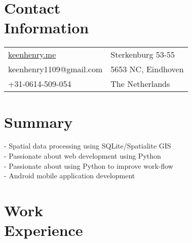 \documentclass[margin,line]{resume}
\begin{document}
\begin{resume}

    \section{\myheadingstyle Contact \\ Information}
      \begin{tabular}{@{}p{7cm}p{6cm}}
      \url{keenhenry.me}      & Sterkenburg 53-55 \\
      keenhenry1109@gmail.com & 5653 NC, Eindhoven \\
      +31-0614-509-054        & The Netherlands \\
      \end{tabular}
 
    \section{\myheadingstyle Summary}
      - Spatial data processing using SQLite/Spatialite GIS \\
      - Passionate about web development using Python \\
      - Passionate about using Python to improve work-flow \\
      - Android mobile application development \\
    \vspace{-5mm}

    \section{\myheadingstyle Work \\ Experience}


\end{resume}
\end{document}
